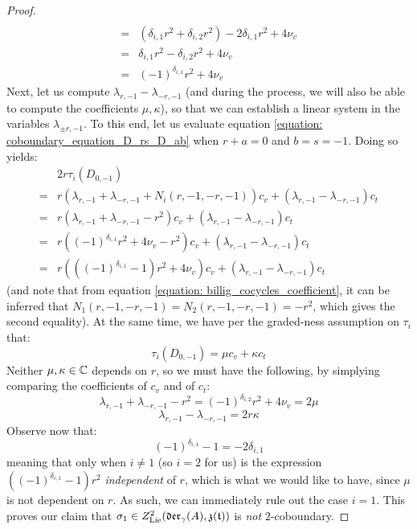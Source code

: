 \begin{proof}
$$\begin{aligned}
                            \\
                            = & ( \delta_{i, 1} r^2 + \delta_{i, 2} r^2 ) - 2\delta_{i, 1} r^2 + 4\nu_v
                            \\
                            = & \delta_{i, 1} r^2 - \delta_{i, 2} r^2 + 4\nu_v
                            \\
                            = & (-1)^{\delta_{i, 1}} r^2 + 4\nu_v
                        \end{aligned}
                    $$
                Next, let us compute $\lambda_{r, -1} - \lambda_{-r, -1}$ (and during the process, we will also be able to compute the coefficients $\mu, \kappa$), so that we can establish a linear system in the variables $\lambda_{\pm r, -1}$. To this end, let us evaluate equation \eqref{equation: coboundary_equation_D_rs_D_ab} when $r + a = 0$ and $b = s = -1$. Doing so yields:
                    $$
                        \begin{aligned}
                            & 2r \tau_i(D_{0, -1})
                            \\
                            = & r\left( \lambda_{r, -1} + \lambda_{-r, -1} + N_i(r, -1, -r, -1) \right) c_v + \left( \lambda_{r, -1} - \lambda_{-r, -1} \right) c_t
                            \\
                            = & r\left( \lambda_{r, -1} + \lambda_{-r, -1} - r^2 \right) c_v + \left( \lambda_{r, -1} - \lambda_{-r, -1} \right) c_t
                            \\
                            = & r\left( (-1)^{\delta_{i, 1}} r^2 + 4\nu_v - r^2 \right) c_v + \left( \lambda_{r, -1} - \lambda_{-r, -1} \right) c_t
                            \\
                            = & r\left( ((-1)^{\delta_{i, 1}} - 1) r^2 + 4\nu_v \right) c_v + \left( \lambda_{r, -1} - \lambda_{-r, -1} \right) c_t
                        \end{aligned}
                    $$
                (and note that from equation \eqref{equation: billig_cocycles_coefficient}, it can be inferred that $N_1(r, -1, -r, -1) = N_2(r, -1, -r, -1) = -r^2$, which gives the second equality). At the same time, we have per the graded-ness assumption on $\tau_i$ that:
                    $$\tau_i(D_{0, -1}) = \mu c_v + \kappa c_t$$
                Neither $\mu, \kappa \in \mathbb{C}$ depends on $r$, so we must have the following, by simplying comparing the coefficients of $c_v$ and of $c_t$:
                    $$\lambda_{r, -1} + \lambda_{-r, -1} - r^2 = (-1)^{\delta_{i, 2}} r^2 + 4\nu_v = 2\mu$$
                    $$\lambda_{r, -1} - \lambda_{-r, -1} = 2r\kappa$$
                Observe now that:
                    $$(-1)^{\delta_{i, 1}} - 1 = -2\delta_{i, 1}$$
                meaning that only when $i \not = 1$ (so $i = 2$ for us) is the expression $((-1)^{\delta_{i, 1}} - 1) r^2$ \textit{independent} of $r$, which is what we would like to have, since $\mu$ is not dependent on $r$. As such, we can immediately rule out the case $i = 1$. This proves our claim that $\sigma_1 \in Z^2_{\mathrm{Lie}}(\mathfrak{der}_{\gamma}(A), \mathfrak{z}(\mathfrak{t}) )$ is \textit{not} $2$-coboundary.
            \end{proof}
